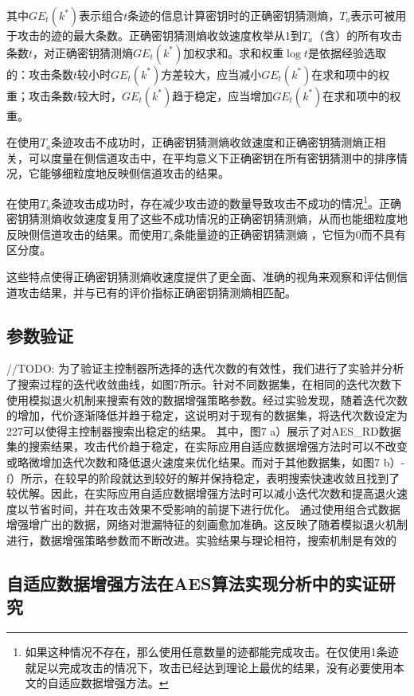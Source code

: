 {	\noindent 其中$GE_t(k^*)$表示组合$t$条迹的信息计算密钥时的正确密钥猜测熵，$T_a$表示可被用于攻击的迹的最大条数。正确密钥猜测熵收敛速度枚举从1到$T_a$（含）的所有攻击条数$t$，对正确密钥猜测熵$GE_t(k^*)$加权求和。求和权重$\log t$是依据经验选取的：攻击条数$t$较小时$GE_t(k^*)$方差较大，应当减小$GE_t(k^*)$在求和项中的权重；攻击条数$t$较大时，$GE_t(k^*)$趋于稳定，应当增加$GE_t(k^*)$在求和项中的权重。
	
	在使用$T_a$条迹攻击不成功时，正确密钥猜测熵收敛速度和正确密钥猜测熵正相关，可以度量在侧信道攻击中，在平均意义下正确密钥在所有密钥猜测中的排序情况，它能够细粒度地反映侧信道攻击的结果。
	
	在使用$T_a$条迹攻击成功时，存在减少攻击迹的数量导致攻击不成功的情况\footnote{如果这种情况不存在，那么使用任意数量的迹都能完成攻击。在仅使用1条迹就足以完成攻击的情况下，攻击已经达到理论上最优的结果，没有必要使用本文的自适应数据增强方法。}。正确密钥猜测熵收敛速度复用了这些不成功情况的正确密钥猜测熵，从而也能细粒度地反映侧信道攻击的结果。而使用$T_a$条能量迹的正确密钥猜测熵 ，它恒为0而不具有区分度。
	
	这些特点使得正确密钥猜测熵收速度提供了更全面、准确的视角来观察和评估侧信道攻击结果，并与已有的评价指标正确密钥猜测熵相匹配。
	
	\subsection{参数验证}
	//TODO:
	为了验证主控制器所选择的迭代次数的有效性，我们进行了实验并分析了搜索过程的迭代收敛曲线，如图7所示。针对不同数据集，在相同的迭代次数下使用模拟退火机制来搜索有效的数据增强策略参数。经过实验发现，随着迭代次数的增加，代价逐渐降低并趋于稳定，这说明对于现有的数据集，将迭代次数设定为227可以使得主控制器搜索出稳定的结果。
	其中，图7 a）展示了对AES\_RD数据集的搜索结果，攻击代价趋于稳定，在实际应用自适应数据增强方法时可以不改变或略微增加迭代次数和降低退火速度来优化结果。而对于其他数据集，如图7 b）- f）所示，在较早的阶段就达到较好的解并保持稳定，表明搜索快速收敛且找到了较优解。因此，在实际应用自适应数据增强方法时可以减小迭代次数和提高退火速度以节省时间，并在攻击效果不受影响的前提下进行优化。
	通过使用组合式数据增强增广出的数据，网络对泄漏特征的刻画愈加准确。这反映了随着模拟退火机制进行，数据增强策略参数而不断改进。实验结果与理论相符，搜索机制是有效的
	
	\subsection{自适应数据增强方法在AES算法实现分析中的实证研究}
	
}
